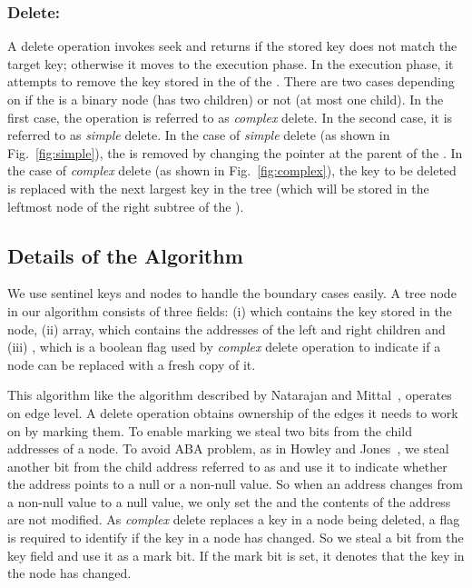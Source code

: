 \subsubsection{Delete:} A delete operation invokes seek and returns \False \space if the stored key does not match the target key; otherwise it moves to the execution phase. In the execution phase, it attempts to remove the key stored in the \terminalnode \space of the \accesspath. There are two cases depending on if the \terminalnode \space is a binary node (has two children) or not (at most one child). In the first case, the operation is referred to as \textit{complex} delete. In the second case, it is referred to as \textit{simple} delete. In the case of \textit{simple} delete (as shown in Fig.~\ref{fig:simple}), the \terminalnode \space is removed by changing the pointer at the parent of the \terminalnode. In the case of \textit{complex} delete (as shown in Fig.~\ref{fig:complex}), the key to be deleted is replaced with the next largest key in the tree (which will be stored in the leftmost node of the right subtree of the \terminalnode). 

\subsection{Details of the Algorithm}

We use sentinel keys and nodes to handle the boundary cases easily. A tree node in our algorithm consists of three fields: (i) \markAndKey \space which contains the key stored in the node, (ii) \child \space array, which contains the addresses of the left and right children and (iii) \readyToReplace, which is a boolean flag used by \textit{complex} delete operation to indicate if a node can be replaced with a fresh copy of it. \par
This algorithm like the algorithm described by Natarajan and Mittal~\cite{Natarajan:2014:PPOPP}, operates on edge level. A delete operation obtains ownership of the edges it needs to work on by marking them. To enable marking we steal two bits from the child addresses of a node. To avoid ABA problem, as in Howley and Jones~\cite{HowJon:2012:SPAA}, we steal another bit from the child address referred to as \nullFlag \space and use it to indicate whether the address points to a null or a non-null value. So when an address changes from a non-null value to a null value, we only set the \nullFlag \space and the contents of the address are not modified. As \textit{complex} delete replaces a key in a node being deleted, a flag is required to identify if the key in a node has changed. So we steal a bit from the key field and use it as a mark bit. If the mark bit is set, it denotes that the key in the node has changed.

